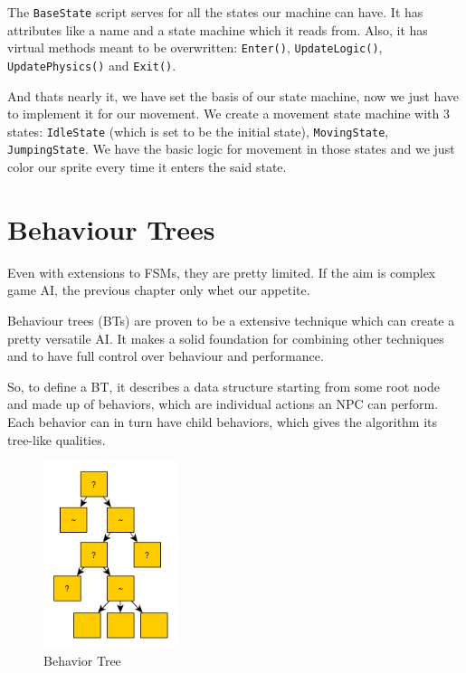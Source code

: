 \documentclass[a4paper, 12pt]{book}
\begin{document}
The \texttt{BaseState} script serves for all the states our machine can have. It has attributes like a name and a state machine which it reads from. Also, it has virtual methods meant to be overwritten: \texttt{Enter()}, \texttt{UpdateLogic()}, \texttt{UpdatePhysics()} and \texttt{Exit()}.

And thats nearly it, we have set the basis of our state machine, now we just have to implement it for our movement. We create a movement state machine with 3 states: \texttt{IdleState} (which is set to be the initial state), \texttt{MovingState}, \texttt{JumpingState}. We have the basic logic for movement in those states and we just color our sprite every time it enters the said state.

\section{Behaviour Trees}

Even with extensions to FSMs, they are pretty limited. If the aim is complex game AI, the previous chapter only whet our appetite.

Behaviour trees (BTs) \cite{BehaviourTreeStarterPack} are proven to be a extensive technique which can create a pretty versatile AI. It makes a solid foundation for combining other techniques and to have full control over behaviour and performance.

So, to define a BT, it describes a data structure starting from some root node and made up of behaviors, which are individual actions an NPC can perform. Each behavior can in turn have child behaviors, which gives the algorithm its tree-like qualities.

\begin{figure}[h]
\begin{center}
    \includegraphics[width=0.35\textwidth]{Images/behaviour_tree.png}
\end{center}
\caption{Behavior Tree}
\label{pic3}
\end{figure}
\end{document}
